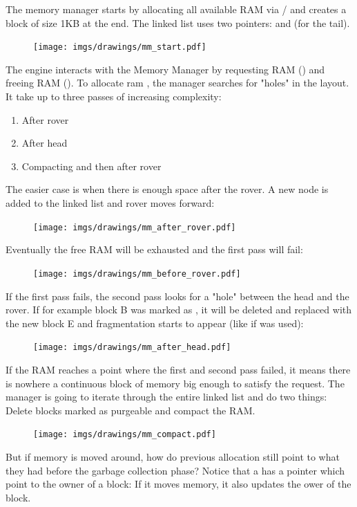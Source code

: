 \documentclass[book.tex]{subfiles}
\begin{document}
The memory manager starts by allocating all available RAM via / and creates a  block of size 1KB at the end. The linked list uses two pointers:  and  (for the tail).
 \par
\begin{figure}[H]
\centering
 \texttt{[image: imgs/drawings/mm\_start.pdf]}
 \end{figure}
 \par
 The engine interacts with the Memory Manager by requesting RAM () and freeing RAM (). To allocate ram , the manager searches for "holes" in the layout. It take up to three passes of increasing complexity:
\begin{enumerate}
\item After rover
\item After head
\item Compacting and then after rover
\end{enumerate}
\par
  The easier case is when there is enough space after the rover. A new node is added to the linked list and rover moves forward:\\
  \par
\begin{figure}[H]
\centering
 \texttt{[image: imgs/drawings/mm\_after\_rover.pdf]}
 \end{figure}
 \par
Eventually the free RAM will be exhausted and the first pass will fail:
  \par
\begin{figure}[H]
\centering
 \texttt{[image: imgs/drawings/mm\_before\_rover.pdf]}
 \end{figure}
 \par
 If the first pass fails, the second pass looks for a "hole" between the head and the rover. If for example block B was marked as , it will be deleted and replaced with the new block E and fragmentation starts to appear (like if  was used):\\
 \begin{figure}[H]
\centering
 \texttt{[image: imgs/drawings/mm\_after\_head.pdf]}
 \end{figure}
 \par
 If the RAM reaches a point where the first and second pass failed, it means there is nowhere a continuous block of memory big enough to satisfy the request. The manager is going to iterate through the entire linked list and do two things: Delete blocks marked as purgeable and compact the RAM.
  \par
\begin{figure}[H]
\centering
 \texttt{[image: imgs/drawings/mm\_compact.pdf]}
 \end{figure}
 \par
But if memory is moved around, how do previous allocation still point to what they had before the garbage collection phase? Notice that a  has a  pointer which point to the owner of a block: If it moves memory, it also updates the ower of the block.
\end{document}
